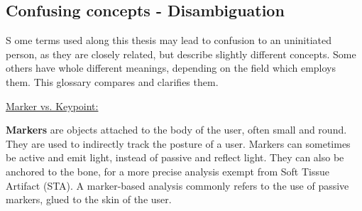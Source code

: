 
{} \mtcaddchapter
\label{Ann:gloss}

\vspace*{-1.6cm}
\begin{flushright}
\section*{\fontsize{20pt}{20pt}\selectfont\textnormal{Confusing concepts - Disambiguation}}
\end{flushright}
\vspace{-0.2cm}


\chead[\fancyplain{}{}]
      {\fancyplain{}{}}
\lfoot[\fancyplain{}{}]
      {\fancyplain{}{}}
\cfoot[\fancyplain{}{\thepage}]
      {\fancyplain{}{\thepage}}
\rfoot[\fancyplain{}{}]%
     {\fancyplain{}{\scriptsize}}


\lettrine[lines=1]{S}{ }ome terms used along this thesis may lead to confusion to an uninitiated person, as they are closely related, but describe slightly different concepts. Some others have whole different meanings, depending on the field which employs them. This glossary compares and clarifies them.

\vspace*{1cm}

\noindent\underline{Marker vs. Keypoint:}

\textbf{Markers} are objects attached to the body of the user, often small and round. They are used to indirectly track the posture of a user. Markers can sometimes be active and emit light, instead of passive and reflect light. They can also be anchored to the bone, for a more precise analysis exempt from Soft Tissue Artifact (STA). A marker-based analysis commonly refers to the use of passive markers, glued to the skin of the user.

